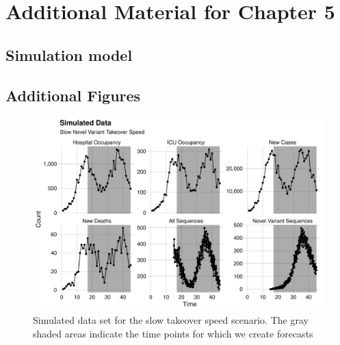 \chapter{Additional Material for Chapter 5}
\graphicspath{{figures/ch_5/}}

\section{Simulation model}
\label{ch_5:sec:full_simulation_model_explanation}

\section{Additional Figures}

\begin{figure}
    \centering
    \includegraphics[width=1.0\columnwidth]{simulated_binned_data_slow_plot}
    \caption[Simulated data set for the slow takeover speed scenario.]{Simulated data set for the slow takeover speed scenario.
    The gray shaded areas indicate the time points for which we create forecasts}
    \label{ch_5:fig:simulated_binned_data_slow_plot}
\end{figure}

